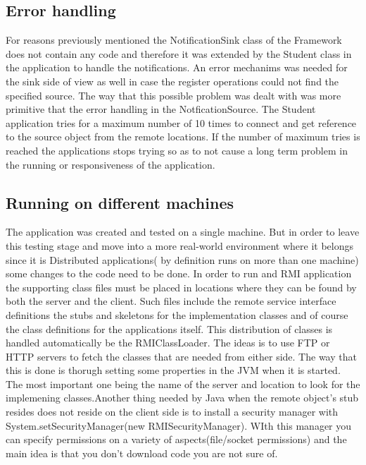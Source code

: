\documentclass[a4paper,12pt,titlepage]{article}
\begin{document}
\subsection{Error handling}
For reasons previously mentioned the NotificationSink class of the Framework does not contain any code and therefore it was extended by the Student class in the application to handle the notifications. An error mechanims was needed for the sink side of view as well in case the register operations could not find the specified source. The way that this possible problem was dealt with was more primitive that the error handling in the NotficationSource. The Student application tries for a maximum number of 10 times to connect and get reference to the source object from the remote locations. If the number of maximum tries is reached the applications stops trying so as to not cause a long term problem in the running or responsiveness of the application.
\subsection{Running on different machines}
The application was created and tested on a single machine. But in order to leave this testing stage and move into a more real-world environment where it belongs since it is Distributed applications( by definition runs on more than one machine) some changes to the code need to be done. In order to run and RMI application the supporting class files must be placed in locations where they can be found by both the server and the client. Such files include the remote service interface definitions the stubs and skeletons for the implementation classes and of course the class definitions for the applications itself. This distribution of classes is handled automatically be the RMIClassLoader. The ideas is to use FTP or HTTP servers to fetch the classes that are needed from either side. The way that this is done is thorugh setting some properties in the JVM when it is started. The most important one being the name of the server and location to look for the implemening classes.Another thing needed by Java when the remote object's stub resides does not reside on the client side is to install a security manager with System.setSecurityManager(new RMISecurityManager). WIth this manager you can specify permissions on a variety of aspects(file/socket permissions) and the main idea is that you don't download code you are not sure of.
\end{document}
